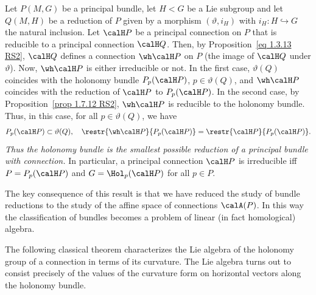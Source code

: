 \begin{rem}\label{rem 1.7.14 RS2}
    Let $P(M,G)$ be a principal bundle, let $H<G$ be a Lie subgroup and let $Q(M,H)$ be a reduction of $P$ given by a morphism $(\vartheta,i_H)$ with $i_H:H\hookrightarrow G$ the natural inclusion. Let $\calH P$ be a principal connection on $P$ that is reducible to a principal connection $\calH Q$. Then, by Proposition~\ref{eq 1.3.13 RS2}, $\calH Q$ defines a connection $\wh\calH P$ on $P$ (the image of $\calH Q$ under $\vartheta$). Now, $\wh\calH P$ is either irreducible or not. In the first case, $\vartheta(Q)$ coincides with the holonomy bundle $P_p(\calH P)$, $p\in\vartheta(Q)$, and $\wh\calH P$ coincides with the reduction of $\calH P$ to $P_p(\calH P)$. In the second case, by Proposition~\ref{prop 1.7.12 RS2}, $\wh\calH P$ is reducible to the holonomy bundle. Thus, in this case, for all $p\in\vartheta(Q)$, we have
    \[P_p(\calH P)\subset\vartheta(Q),\quad \restr{\wh\calH P}{P_p(\calH P)}=\restr{\calH P}{P_p(\calH P)}.\]
    \emph{Thus the holonomy bundle is the smallest possible reduction of a principal bundle with connection.} In particular, a principal connection $\calH P$ is irreducible iff $P=P_p(\calH P)$ and $G=\Hol_p(\calH P)$ for all $p\in P$.

    The key consequence of this result is that we have reduced the study of bundle reductions to the study of the affine space of connections $\calA(P)$. In this way the classification of bundles becomes a problem of linear (in fact homological) algebra.
\end{rem} 

The following classical theorem characterizes the Lie algebra of the holonomy group of a connection in terms of its curvature. The Lie algebra turns out to consist precisely of the values of the curvature form on horizontal vectors along the holonomy bundle.

